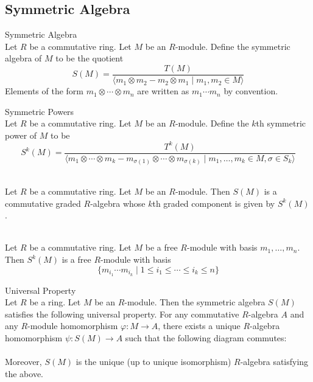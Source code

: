 \documentclass[a4paper]{article}
\begin{document}
\subsection{Symmetric Algebra}
\begin{defn}{Symmetric Algebra}{}\\
Let $R$ be a commutative ring. Let $M$ be an $R$-module. Define the symmetric algebra of $M$ to be the quotient $$S(M)=\frac{T(M)}{\langle m_1\otimes m_2-m_2\otimes m_1\;|\;m_1,m_2\in M\rangle}$$ Elements of the form $m_1\otimes\cdots\otimes m_n$ are written as $m_1\cdots m_n$ by convention. 
\end{defn}

\begin{defn}{Symmetric Powers}{}\\
Let $R$ be a commutative ring. Let $M$ be an $R$-module. Define the $k$th symmetric power of $M$ to be $$S^k(M)=\frac{T^k(M)}{\langle m_1\otimes\cdots\otimes m_k-m_{\sigma(1)}\otimes\cdots\otimes m_{\sigma(k)}\;|\;m_1,\dots,m_k\in M,\sigma\in S_k\rangle}$$
\end{defn}

\begin{lmm}{}{}\\
Let $R$ be a commutative ring. Let $M$ be an $R$-module. Then $S(M)$ is a commutative graded $R$-algebra whose $k$th graded component is given by $S^k(M)$. 
\end{lmm}

\begin{prp}{}{}\\
Let $R$ be a commutative ring. Let $M$ be a free $R$-module with basis $m_1,\dots,m_n$. Then $S^k(M)$ is a free $R$-module with basis $$\{m_{i_1}\cdots m_{i_k}\;|\;1\leq i_1\leq\cdots\leq i_k\leq n\}$$
\end{prp}

\begin{prp}{Universal Property}{}\\
Let $R$ be a ring. Let $M$ be an $R$-module. Then the symmetric algebra $S(M)$ satisfies the following universal property. For any commutative $R$-algebra $A$ and any $R$-module homomorphism $\varphi:M\to A$, there exists a unique $R$-algebra homomorphism $\psi:S(M)\to A$ such that the following diagram commutes: \\
\\
Moreover, $S(M)$ is the unique (up to unique isomorphism) $R$-algebra satisfying the above. 
\end{prp}
\end{document}
